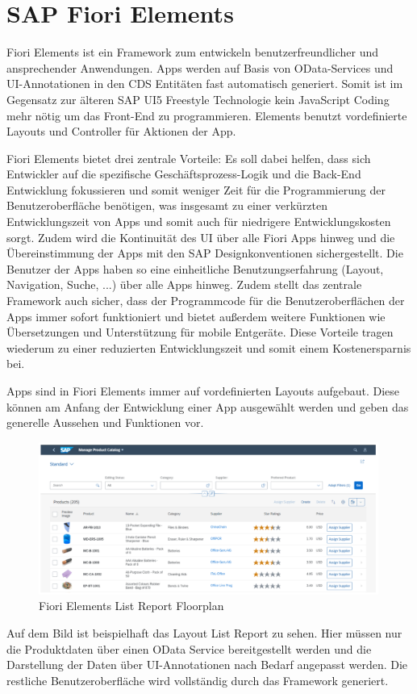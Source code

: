 \section{SAP Fiori Elements}

Fiori Elements ist ein Framework zum entwickeln benutzerfreundlicher und ansprechender Anwendungen. Apps werden auf Basis von OData-Services und UI-Annotationen in den CDS Entitäten fast automatisch generiert. Somit ist im Gegensatz zur älteren SAP UI5 Freestyle Technologie kein JavaScript Coding mehr nötig um das Front-End zu programmieren. Elements benutzt vordefinierte Layouts und Controller für Aktionen der App.

Fiori Elements bietet drei zentrale Vorteile: Es soll dabei helfen, dass sich Entwickler auf die spezifische Geschäftsprozess-Logik und die Back-End Entwicklung fokussieren und somit weniger Zeit für die Programmierung der Benutzeroberfläche benötigen, was insgesamt zu einer verkürzten Entwicklungszeit von Apps und somit auch für niedrigere Entwicklungskosten sorgt. Zudem wird die Kontinuität des UI über alle Fiori Apps hinweg und die Übereinstimmung der Apps mit den SAP Designkonventionen sichergestellt. Die Benutzer der Apps haben so eine einheitliche Benutzungserfahrung (Layout, Navigation, Suche, ...) über alle Apps hinweg. Zudem stellt das zentrale Framework auch sicher, dass der Programmcode für die Benutzeroberflächen der Apps immer sofort funktioniert und bietet au{\ss}erdem weitere Funktionen wie Übersetzungen und Unterstützung für mobile Entgeräte. Diese Vorteile tragen wiederum zu einer reduzierten Entwicklungszeit und somit einem Kostenersparnis bei.

Apps sind in Fiori Elements immer auf vordefinierten Layouts aufgebaut. Diese können am Anfang der Entwicklung einer App ausgewählt werden und geben das generelle Aussehen und Funktionen vor.

\begin{figure}[h]
    \centering
    \includegraphics[height=5cm]{Bilder/Fiori_Elements_List_Floorplan.png}
    \caption[Fiori Elements List Report Floorplan]{Fiori Elements List Report Floorplan}
    \label{fig:iso_norm}
\end{figure}

Auf dem Bild ist beispielhaft das Layout List Report zu sehen. Hier müssen nur die Produktdaten über einen OData Service bereitgestellt werden und die Darstellung der Daten über UI-Annotationen nach Bedarf angepasst werden. Die restliche Benutzeroberfläche wird vollständig durch das Framework generiert. 